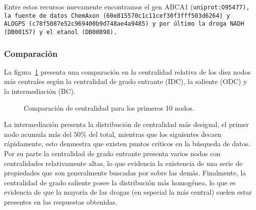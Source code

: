 Entre estos recursos nuevamente encontramos el gen ABCA1 (\tt{uniprot:O95477}),
la fuente de datos ChemAxon (\tt{60e815570c1c11cef30f3fff503d6264}) y ALOGPS
(\tt{c78f5087e52c969400b9d748ae4a9485}) y por último la droga
NADH (\tt{DB00157}) y el etanol (\tt{DB00898}).

\subsubsection{Comparación}
La figura~\ref{fig:compcent} presenta una comparación en la centralidad relativa
de los diez nodos más centrales según la centralidad de grado entrante (IDC), la
saliente (ODC) y la intermediación (BC).
\begin{figure}[h]
  \caption{Comparación de centralidad para los primeros 10 nodos.}
  \label{fig:compcent}
\end{figure}

La intermediación presenta la distribución de centralidad más desigual, el
primer nodo acumula más del $50\%$ del total, mientras que los siguientes decaen
rápidamente, esto demuestra que existen puntos críticos en la búsqueda de datos.
Por su parte la centralidad de grado entrante presenta varios nodos con
centralidades relativamente altas, lo que evidencia la existencia de una serie
de propiedades que son generalmente buscadas por sobre las demás.
Finalmente, la centralidad de grado saliente posee la distribución más
homogénea, lo que es evidencia de que la mayoría de las drogas (en especial la
más central) suelen estar presentes en las respuestas obtenidas.

